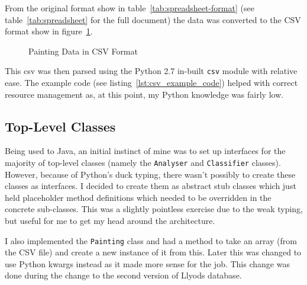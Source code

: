 From the original format show in table~\ref{tab:spreadsheet-format} (see 
table~\ref{tab:spreadsheet} for the full document) the data was converted to the CSV format show
in figure~\ref{fig:csv-spreadsheet}.

\begin{table}[h]
\caption{Layout of the Painting Data Spreadsheet}\label{tab:spreadsheet-format}
\end{table}

\begin{figure}[h]
\caption{Painting Data in CSV Format}\label{fig:csv-spreadsheet}
\end{figure}

This \gls{csv} was then parsed using the Python 2.7 in-built \texttt{csv} module with relative 
ease. The example code (see listing~\ref{lst:csv_example_code}) helped with correct resource 
management as, at this point, my Python knowledge was fairly low.


\subsection{Top-Level Classes}
Being used to Java, an initial instinct of mine was to set up interfaces for the majority of 
top-level classes (namely the \texttt{Analyser} and \texttt{Classifier} classes). However, 
because of Python's duck typing, there wasn't possibly to create these classes as interfaces. I 
decided to create them as abstract stub classes which just held placeholder method definitions 
which needed to be overridden in the concrete sub-classes. This was a slightly pointless exercise 
due to the weak typing, but useful for me to get my head around the architecture.

I also implemented the \texttt{Painting} class and had a method to take an array (from the CSV 
file) and create a new instance of it from this. Later this was changed to use Python 
\gls{kwargs} instead as it made more sense for the job. This change was done during the change to 
the second version of Llyods database.


